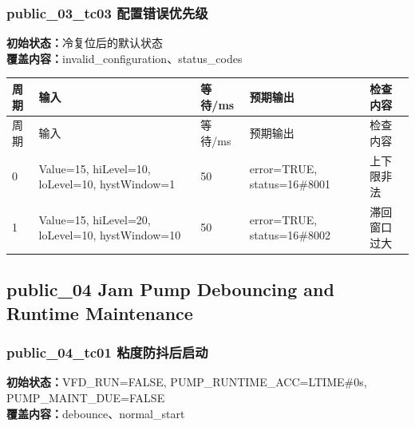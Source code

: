 \subsubsection{{\ttfamily public\_03\_tc03} 配置错误优先级}

\noindent\textbf{初始状态：}冷复位后的默认状态\\

\textbf{覆盖内容：}invalid\_configuration、status\_codes

\begin{longtable}{L{1.0cm}L{4.7cm}L{1.4cm}L{4.0cm}L{2.1cm}}

\toprule

周期 & 输入 & 等待/ms & 预期输出 & 检查内容\\

\midrule

\endfirsthead

\toprule

周期 & 输入 & 等待/ms & 预期输出 & 检查内容\\

\midrule

\endhead

0 & Value=15, hiLevel=10, loLevel=10, hystWindow=1 & 50 & error=TRUE, status=16\#8001 & 上下限非法\\

1 & Value=15, hiLevel=20, loLevel=10, hystWindow=10 & 50 & error=TRUE, status=16\#8002 & 滞回窗口过大\\

\bottomrule

\end{longtable}

\subsection{{\ttfamily public\_04} Jam Pump Debouncing and Runtime Maintenance}

\subsubsection{{\ttfamily public\_04\_tc01} 粘度防抖后启动}

\noindent\textbf{初始状态：}VFD\_RUN=FALSE, PUMP\_RUNTIME\_ACC=LTIME\#0s, PUMP\_MAINT\_DUE=FALSE\\

\textbf{覆盖内容：}debounce、normal\_start

